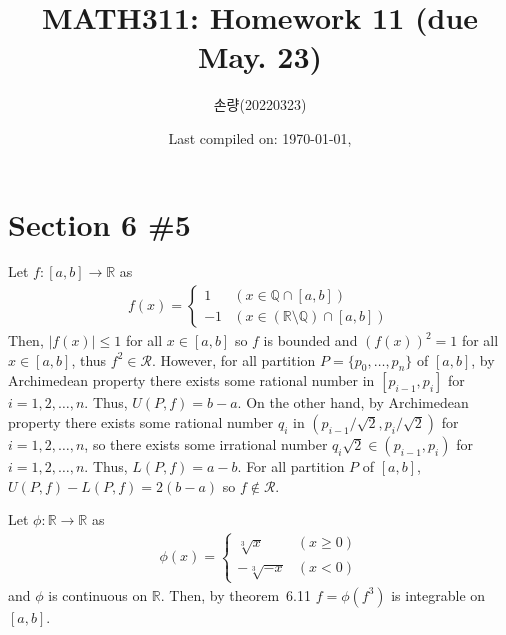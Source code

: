 \documentclass{scrartcl}
\title{MATH311: Homework 11 (due May. 23)}
\author{손량(20220323)}
\date{Last compiled on: \today, \currenttime}
\begin{document}
\maketitle

\section{Section 6 \#5}
Let \(f : [a, b] \to \mathbb{R}\) as
\begin{align*}
  f(x) = \begin{cases}
    1 & (x \in \mathbb{Q} \cap [a, b]) \\
    -1 & (x \in (\mathbb{R} \setminus \mathbb{Q}) \cap [a, b])
  \end{cases}
\end{align*}
Then, \(|f(x)| \leq 1\) for all \(x \in [a, b]\) so \(f\) is bounded and \((f(x))^2 = 1\) for all \(x \in [a, b]\), thus \(f^2 \in \mathscr{R}\).
However, for all partition \(P = \{p_0, \dots, p_n\}\) of \([a, b]\), by Archimedean property there exists some rational number in \([p_{i - 1}, p_i]\) for \(i = 1, 2, \dots, n\).
Thus, \(U(P, f) = b - a\).
On the other hand, by Archimedean property there exists some rational number \(q_i\) in \((p_{i - 1} / \sqrt{2}, p_i / \sqrt{2})\) for \(i = 1, 2, \dots, n\), so there exists some irrational number \(q_i \sqrt{2} \in (p_{i - 1}, p_i)\) for \(i = 1, 2, \dots, n\).
Thus, \(L(P, f) = a - b\).
For all partition \(P\) of \([a, b]\), \(U(P, f) - L(P, f) = 2(b - a)\) so \(f \not \in \mathscr{R}\).

Let \(\phi : \mathbb{R} \to \mathbb{R}\) as
\begin{align*}
  \phi(x) = \begin{cases}
    \sqrt[3]{x} & (x \geq 0) \\
    -\sqrt[3]{-x} & (x < 0)
  \end{cases}
\end{align*}
and \(\phi\) is continuous on \(\mathbb{R}\).
Then, by theorem~6.11 \(f = \phi(f^3)\) is integrable on \([a, b]\).
\end{document}
